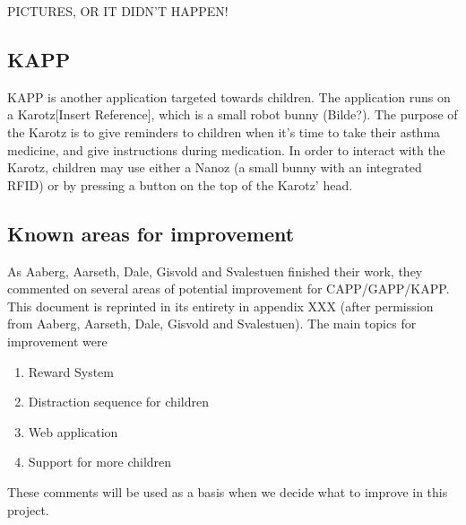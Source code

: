 PICTURES, OR IT DIDN'T HAPPEN!



\subsection{KAPP}
KAPP is another application targeted towards children. The application runs on a Karotz[Insert Reference], which is a small robot bunny (Bilde?). The purpose of the Karotz is to give reminders to children when it's time to take their asthma medicine, and give instructions during medication. In order to interact with the Karotz, children may use either a Nanoz (a small bunny with an integrated RFID) or by pressing a button on the top of the Karotz' head.    

\subsection{Known areas for improvement}
As Aaberg, Aarseth, Dale, Gisvold and Svalestuen finished their work, they commented on several areas of potential improvement for CAPP/GAPP/KAPP. This document is reprinted in its entirety in appendix XXX (after permission from Aaberg, Aarseth, Dale, Gisvold and Svalestuen). The main topics for improvement were
\begin{enumerate}
\item{Reward System}
\item{Distraction sequence for children}
\item{Web application}
\item{Support for more children}
\end{enumerate}

These comments will be used as a basis when we decide what to improve in this project.




